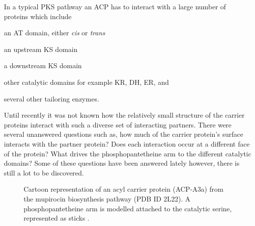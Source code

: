 			In a typical PKS pathway an ACP has to interact with a large number of proteins which include 
			\begin{inparaenum}[\itshape 1\upshape)]
			\item an AT domain, either \textit{cis} or \textit{trans} 
			\item an upstream KS domain 
			\item a downstream KS domain 
			\item other catalytic domains for example KR, DH, ER, and
			\item several other tailoring enzymes. 
			\end{inparaenum}
			Until recently it was not known how the relatively small structure of the carrier proteins interact with such a diverse set of interacting partners. There were several unanswered questions such as, how much of the carrier protein\textquoteright s surface interacts with the partner protein? Does each interaction occur at a different face of the protein? What drives the phosphopantetheine arm to the different catalytic domains? Some of these questions have been answered lately however, there is still a lot to be discovered. 

			
			\setlength\fboxsep{5pt}
			\setlength\fboxrule{1.5pt}
			\begin{figure} []
			\centering
			\caption[Cartoon representation of an acyl carrier protein from mupirocin pathway]{Cartoon representation of an acyl carrier protein (ACP-A3a) from the mupirocin biosynthesis pathway (PDB ID 2L22). A phosphopantetheine arm is modelled attached to the catalytic serine, represented as sticks \parencite{Haines2013}. }
			\label{fig:acp}
			\end{figure}
			
